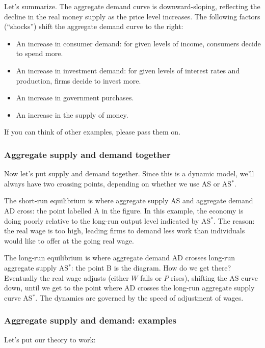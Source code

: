 \documentclass[letterpaper,12pt]{article}
\begin{document}
Let's summarize. 
The aggregate demand curve is downward-sloping, reflecting 
the decline in the real money supply as the price level increases.
The following factors (``shocks'') 
shift the aggregate demand curve to the right:
%
\begin{itemize}
\item An increase in consumer demand:  for given levels of income, 
consumers decide to spend more.   
\item An increase in investment demand:
for given levels of interest rates and production, 
firms decide to invest more.  
\item An increase in government purchases.  
\item An increase in the supply of money.  
\end{itemize}
%
If you can think of other examples, please pass them on.  

\subsubsection*{Aggregate supply and demand together} 

Now let's put supply and demand together.  
Since this is a dynamic model, we'll always have two crossing
points, depending on whether we use AS or AS$^*$.  

The short-run equilibrium is where aggregate supply AS and aggregate 
demand AD cross:  the point labelled A in the figure. 
In this example, the economy is doing poorly 
relative to the long-run output level indicated by AS$^*$.  
The reason:  the real wage is too high, leading firms to demand 
less work than individuals would like to offer at the going real wage.  

The long-run equilibrium is where aggregate demand AD crosses 
long-run aggregate supply AS$^*$:  the point B is the diagram.  
How do we get there?  
Eventually the real wage adjusts (either $W$ falls or $P$ rises), 
shifting the AS curve down, until
we get to the point where AD crosses the long-run aggregate supply 
curve AS$^*$.  
The dynamics are governed by the speed of adjustment of wages.  


\subsubsection*{Aggregate supply and demand:  examples}

Let's put our theory to work: 

\end{document}
